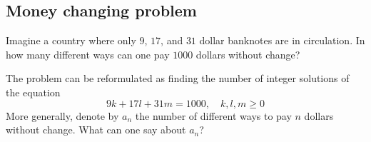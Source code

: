 \subsection{Money changing problem}
Imagine a country where only $9$, $17$, and $31$ dollar banknotes are in circulation.
In how many different ways can one pay $1000$ dollars without change?

The problem can be reformulated as finding the number of integer solutions of the equation
\[
9k + 17l + 31m = 1000, \quad k, l, m \ge 0
\]
More generally, denote by $a_n$ the number of different ways to pay $n$ dollars without change.
What can one say about $a_n$?
